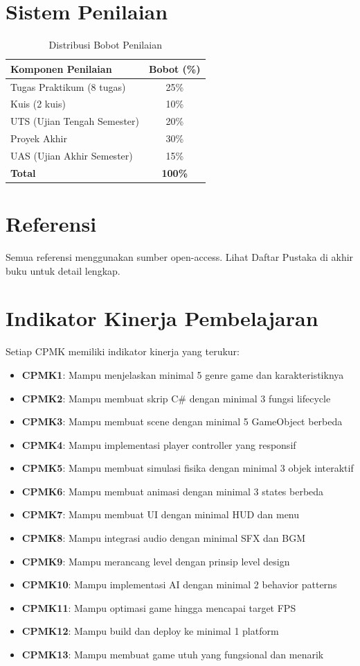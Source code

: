 \section{Sistem Penilaian}

\begin{table}[h]
\centering
\caption{Distribusi Bobot Penilaian}
\label{tab:bobot_penilaian_rps}
\begin{tabular}{|l|c|}
\hline
\textbf{Komponen Penilaian} & \textbf{Bobot (\%)} \\
\hline
Tugas Praktikum (8 tugas) & 25\% \\
Kuis (2 kuis) & 10\% \\
UTS (Ujian Tengah Semester) & 20\% \\
Proyek Akhir & 30\% \\
UAS (Ujian Akhir Semester) & 15\% \\
\hline
\textbf{Total} & \textbf{100\%} \\
\hline
\end{tabular}
\end{table}

\section{Referensi}

Semua referensi menggunakan sumber open-access. Lihat Daftar Pustaka di akhir buku untuk detail lengkap.

\section{Indikator Kinerja Pembelajaran}

Setiap CPMK memiliki indikator kinerja yang terukur:
\begin{itemize}
\item \textbf{CPMK1}: Mampu menjelaskan minimal 5 genre game dan karakteristiknya
\item \textbf{CPMK2}: Mampu membuat skrip C\# dengan minimal 3 fungsi lifecycle
\item \textbf{CPMK3}: Mampu membuat scene dengan minimal 5 GameObject berbeda
\item \textbf{CPMK4}: Mampu implementasi player controller yang responsif
\item \textbf{CPMK5}: Mampu membuat simulasi fisika dengan minimal 3 objek interaktif
\item \textbf{CPMK6}: Mampu membuat animasi dengan minimal 3 states berbeda
\item \textbf{CPMK7}: Mampu membuat UI dengan minimal HUD dan menu
\item \textbf{CPMK8}: Mampu integrasi audio dengan minimal SFX dan BGM
\item \textbf{CPMK9}: Mampu merancang level dengan prinsip level design
\item \textbf{CPMK10}: Mampu implementasi AI dengan minimal 2 behavior patterns
\item \textbf{CPMK11}: Mampu optimasi game hingga mencapai target FPS
\item \textbf{CPMK12}: Mampu build dan deploy ke minimal 1 platform
\item \textbf{CPMK13}: Mampu membuat game utuh yang fungsional dan menarik
\end{itemize}
